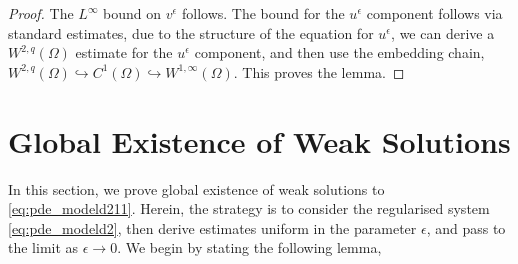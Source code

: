 \documentclass[10pt]{amsart}
\theoremstyle{plain}
\theoremstyle{definition}
\begin{document}
\begin{proof}
The $L^{\infty}$ bound on $v^{\epsilon}$ follows. The bound for the $u^{\epsilon}$ component follows via standard estimates, due to the structure of the equation for $u^{\epsilon}$, we can derive a $W^{2,q}(\Omega)$ estimate for the $u^{\epsilon}$ component, and then use the embedding chain, $W^{2,q}(\Omega) \hookrightarrow C^{1}(\Omega) \hookrightarrow W^{1, \infty}(\Omega)$. This proves the lemma.
\end{proof}
\section{Global Existence of Weak Solutions}

In this section, we prove global existence of weak solutions to \eqref{eq:pde_modeld211}. Herein, the strategy is to consider the regularised system \eqref{eq:pde_modeld2}, then derive estimates uniform in the parameter $\epsilon$, and pass to the limit as $\epsilon \rightarrow 0$. We begin by stating the following lemma,
\end{document}
